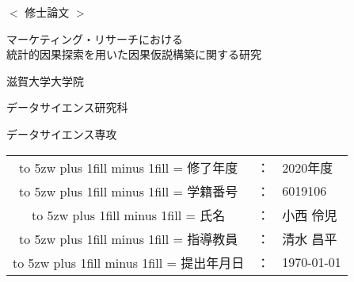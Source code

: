 

\newcommand{\kintou}[2]{%
\leavevmode
\hbox to #1{%
\kanjiskip=0pt plus 1fill minus 1fill
\xkanjiskip=\kanjiskip
#2}}

\begin{center}
  \vspace*{15mm}
  \huge $<$ 修士論文 $>$ \par
  \vspace{15mm}
  \LARGE マーケティング・リサーチにおける \\
  統計的因果探索を用いた因果仮説構築に関する研究 \par
  \vspace{30mm}
  \Large 滋賀大学大学院 \par
  \Large データサイエンス研究科 \par
  \Large データサイエンス専攻 \par
  \vspace{30mm}
  \Large
  \begin{tabular}{ccl}
    \kintou{5zw}{修了年度}&：& 2020年度 \\
    \kintou{5zw}{学籍番号}&：& 6019106 \\
    \kintou{5zw}{氏名}&：& 小西 伶児 \\
    \kintou{5zw}{指導教員}&：& 清水 昌平 \\
    \kintou{5zw}{提出年月日}&：& \today \\
  \end{tabular}
\end{center}

\thispagestyle{empty}

\newpage
\tableofcontents
%
%
%
